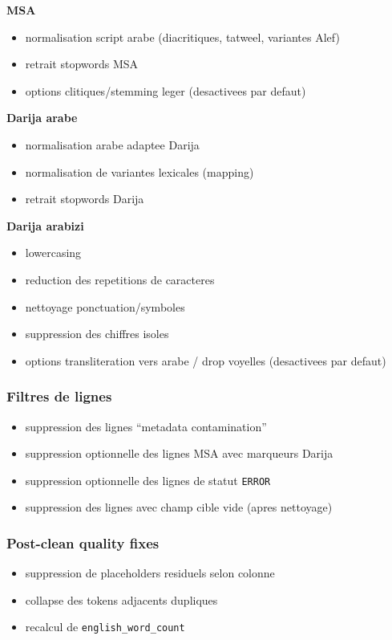 \documentclass[11pt,a4paper]{article}
\begin{document}
\textbf{MSA}
\begin{itemize}[leftmargin=*]
  \item normalisation script arabe (diacritiques, tatweel, variantes Alef)
  \item retrait stopwords MSA
  \item options clitiques/stemming leger (desactivees par defaut)
\end{itemize}

\textbf{Darija arabe}
\begin{itemize}[leftmargin=*]
  \item normalisation arabe adaptee Darija
  \item normalisation de variantes lexicales (mapping)
  \item retrait stopwords Darija
\end{itemize}

\textbf{Darija arabizi}
\begin{itemize}[leftmargin=*]
  \item lowercasing
  \item reduction des repetitions de caracteres
  \item nettoyage ponctuation/symboles
  \item suppression des chiffres isoles
  \item options transliteration vers arabe / drop voyelles (desactivees par defaut)
\end{itemize}

\subsubsection{Filtres de lignes}
\begin{itemize}[leftmargin=*]
  \item suppression des lignes ``metadata contamination''
  \item suppression optionnelle des lignes MSA avec marqueurs Darija
  \item suppression optionnelle des lignes de statut \texttt{ERROR}
  \item suppression des lignes avec champ cible vide (apres nettoyage)
\end{itemize}

\subsubsection{Post-clean quality fixes}
\begin{itemize}[leftmargin=*]
  \item suppression de placeholders residuels selon colonne
  \item collapse des tokens adjacents dupliques
  \item recalcul de \texttt{english\_word\_count}
\end{itemize}
\end{document}
